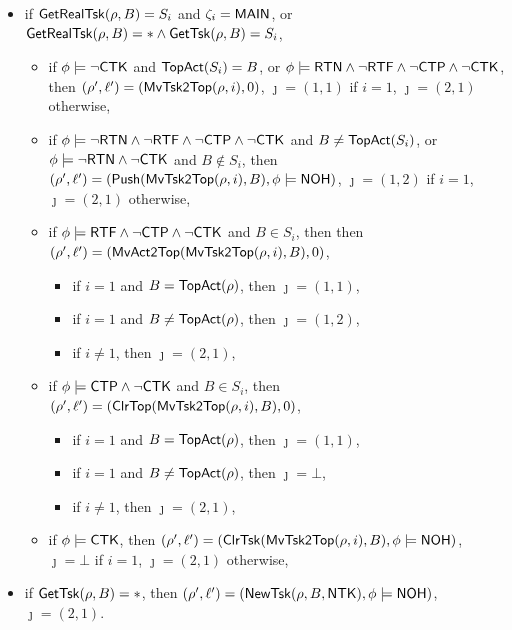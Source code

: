 {\begin{itemize}
\begin{itemize}
\begin{itemize}
\begin{itemize}
				\item if $i \neq 1$, then $\jmath = (2,1)$,
			\end{itemize}
            \item if $\phi \models\ctkflag$, 
			then $(\rho',\ell') = (\clrtsk(\mvtsktop(\rho, i), B),\phi\models\nohflag)$, $\jmath = \bot$ if $i = 1$, $\jmath = (2,1)$ otherwise,
            \end{itemize}
            \item if $\mathsf{GetRealTsk}(\rho, B) = S_i$ and $\zeta_i={\sf MAIN}$,
        or $ \mathsf{GetRealTsk}(\rho, B) = * \wedge \mathsf{GetTsk}(\rho, B) = S_i$, 
		\begin{itemize}
            \item if $\phi \models \neg{\sf CTK}$ and $\mathsf{TopAct}(S_i) = B$, 
            or $\phi\models{\sf RTN}\wedge\neg{\sf RTF}\wedge\neg{\sf CTP}\wedge\neg{\sf CTK}$,
			then $(\rho',\ell')=(\mathsf{MvTsk2Top}(\rho, i), 0)$, $\jmath = (1,1)$ if $i = 1$, $\jmath = (2,1)$ otherwise,
            \item if $\phi\models\neg{\sf RTN}\wedge\neg{\sf RTF}\wedge\neg{\sf CTP}\wedge\neg{\sf CTK}$ and $B\neq\mathsf{TopAct}(S_i)$,
			or $\phi\models\neg{\sf RTN}\wedge\neg{\sf CTK}$ and $B\notin S_i$,
			then $(\rho',\ell')=(\mathsf{Push}(\mathsf{MvTsk2Top}(\rho, i), B),\phi\models{\sf NOH})$, $\jmath = (1,2)$ if $i = 1$, $\jmath = (2,1)$ otherwise,
            \item if $\phi \models {\sf RTF} \wedge \neg {\sf CTP}\wedge\neg{\sf CTK}$ and $B \in S_i$, then 
			then $(\rho',\ell')=(\mathsf{MvAct2Top}(\mathsf{MvTsk2Top}(\rho, i), B),0)$,
			\begin{itemize}
				\item if $i = 1$ and $B = \mathsf{TopAct}(\rho)$, then $\jmath = (1,1)$,
				\item if $i = 1$ and $B \neq \mathsf{TopAct}(\rho)$, then $\jmath = (1,2)$,
				\item if $i \neq 1$, then $\jmath = (2,1)$,
			\end{itemize}
            \item if $\phi \models{\sf CTP}\wedge\neg{\sf CTK}$ and $B \in S_i$, 
			then $(\rho',\ell') =(\mathsf{ClrTop}(\mathsf{MvTsk2Top}(\rho, i), B), 0)$, 
			\begin{itemize}
				\item if $i = 1$ and $B = \mathsf{TopAct}(\rho)$, then $\jmath = (1,1)$,
				\item if $i = 1$ and $B \neq \mathsf{TopAct}(\rho)$, then $\jmath = \bot$,
				\item if $i \neq 1$, then $\jmath = (2,1)$,
			\end{itemize}
            \item if $\phi \models\ctkflag$,
			then $(\rho',\ell') = (\clrtsk(\mvtsktop(\rho, i), B),\phi\models\nohflag)$, $\jmath = \bot$ if $i = 1$, $\jmath = (2,1)$ otherwise,
		\end{itemize}
		\item if $\mathsf{GetTsk}(\rho, B) = *$, then $(\rho',\ell') = (\mathsf{NewTsk}(\rho, B, {\sf NTK}), \phi\models{\sf NOH})$, $\jmath = (2,1)$.
	\end{itemize}
	

\end{itemize}}
